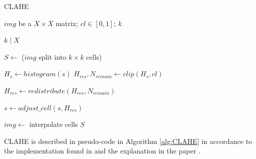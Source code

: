 \begin{algorithm}
    \caption{CLAHE}\label{alg:CLAHE}
    \begin{algorithmic}[1]
        \Require $img$ be a $X\times X$ matrix; $cl \in [0, 1]$; $k$

        \Ensure $k \mid X$

        \State $S \gets $ ($img$ split into $k\times k$ cells)\label{line:CLAHE:split}

            \State $H_s \gets histogram(s)$
            \State $H_{res}, N_{remain} \gets clip(H_s, cl)$

            \State $H_{res} \gets redistribute(H_{res}, N_{remain})$\label{line:CLAHE:redistribute}

            \State $s \gets adjust\_cell(s, H_{res})$
        \EndFor

        \State $img \gets$ interpolate cells $S$

    \end{algorithmic}
\end{algorithm}

CLAHE is described in pseudo-code in Algorithm \ref{alg:CLAHE} in accordance to the implementation found in \cite{site:CLAHE_code} and the explanation in the paper \cite{article:CLAHE_explanation}.

